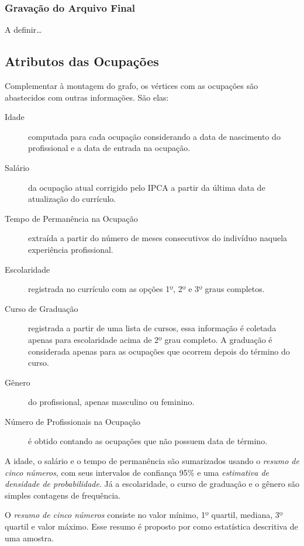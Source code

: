 \documentclass[12pt,a4paper]{article}
\theoremstyle{hypo}
\begin{document}

\subsubsection{Gravação do Arquivo Final}

A definir\ldots

\subsection{Atributos das Ocupações}

Complementar à montagem do grafo, os vértices com as ocupações são abastecidos com outras informações. São elas:

\begin{description}
  \item[Idade] computada para cada ocupação considerando a data de nascimento do profissional e a data de entrada na ocupação.
  \item[Salário] da ocupação atual corrigido pelo IPCA a partir da última data de atualização do currículo.
  \item[Tempo de Permanência na Ocupação] extraída a partir do número de meses consecutivos do indivíduo naquela experiência profissional.
  \item[Escolaridade] registrada no currículo com as opções 1º, 2º e 3º graus completos.
  \item[Curso de Graduação] registrada a partir de uma lista de cursos, essa informação é coletada apenas para escolaridade acima de 2º grau completo. A graduação é considerada apenas para as ocupações que ocorrem depois do término do curso.
  \item[Gênero] do profissional, apenas masculino ou feminino.
  \item[Número de Profissionais na Ocupação] é obtido contando as ocupações que não possuem data de término.
\end{description}

A idade, o salário e o tempo de permanência são sumarizados usando o \textit{resumo de cinco números}, com seus intervalos de confiança 95\% e uma \textit{estimativa de densidade de probabilidade}. Já a escolaridade, o curso de graduação e o gênero são simples contagens de frequência.

O \textit{resumo de cinco números} consiste no valor mínimo, 1º quartil, mediana, 3º quartil e valor máximo. Esse resumo é proposto por  como estatística descritiva de uma amostra.
\end{document}
